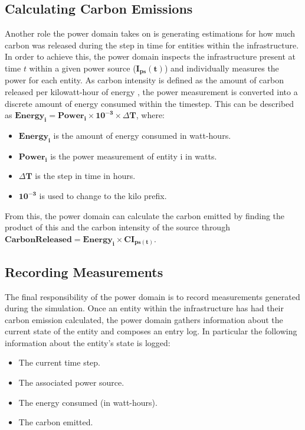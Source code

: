 \documentclass{l4proj}
\begin{document}
\subsection{Calculating Carbon Emissions}\label{subsec:carbon-released}
Another role the power domain takes on is generating estimations for how much carbon was released during the step in time for entities within the infrastructure.
In order to achieve this, the power domain inspects the infrastructure present at time $t$ within a given power source ($\mathbf{I_{ps}(t)}$) and individually measures the power for each entity.
As carbon intensity is defined as the amount of carbon released per kilowatt-hour of energy \citep{owid-electricity-mix}, the power measurement is converted into a discrete amount of energy consumed within the timestep.
This can be described as $\mathbf{Energy_{i}} = \mathbf{Power_{i}} \times \mathbf{10^{-3}} \times \mathbf{\varDelta T}$, where:
\begin{itemize}
    \item $\mathbf{Energy_{i}}$ is the amount of energy consumed in watt-hours.
    \item $\mathbf{Power_{i}}$ is the power measurement of entity i in watts.
    \item $\mathbf{\varDelta T}$ is the step in time in hours.
    \item $\mathbf{10^{-3}}$ is used to change to the kilo prefix.
\end{itemize}
From this, the power domain can calculate the carbon emitted by finding the product of this and the carbon intensity of the source through $\mathbf{Carbon Released = Energy_{i} \times CI_{ps(t)}}$.

\subsection{Recording Measurements}\label{subsec:power-domain-recording-measurements}
The final responsibility of the power domain is to record measurements generated during the simulation.
Once an entity within the infrastructure has had their carbon emission calculated, the power domain gathers information about the current state of the entity and composes an entry log.
In particular the following information about the entity's state is logged:
\begin{itemize}
    \item The current time step.
    \item The associated power source.
    \item The energy consumed (in watt-hours).
    \item The carbon emitted.
\end{itemize}
\end{document}
